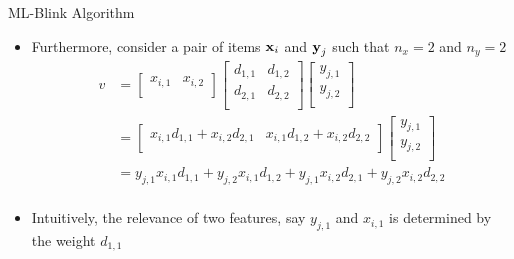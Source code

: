 \begin{frame}{ML-Blink Algorithm}
    \begin{itemize}
        \item Furthermore, consider a pair of items $\boldsymbol{\mathbf{x}}_i$ and $\boldsymbol{\mathbf{y}}_j$ such that $n_x = 2$ and $n_y = 2$
            \begin{equation} 
                \begin{split} 
                    v &= 
                        \begin{bmatrix}
                            x_{i,1} & x_{i,2} \\
                        \end{bmatrix}
                        \begin{bmatrix}
                            d_{1,1} & d_{1,2} \\
                            d_{2,1} & d_{2,2} \\
                        \end{bmatrix}
                        \begin{bmatrix}
                            y_{j,1} \\
                            y_{j,2} \\
                        \end{bmatrix} \\
                    &=
                        \begin{bmatrix}
                            x_{i,1}d_{1,1} + x_{i,2}d_{2,1} & x_{i,1}d_{1,2} + x_{i,2}d_{2,2} \\
                        \end{bmatrix}    
                        \begin{bmatrix}
                            y_{j,1} \\
                            y_{j,2} \\
                        \end{bmatrix} \\
                    &= 
                        y_{j,1}x_{i,1}d_{1,1} + y_{j,2}x_{i,1}d_{1,2} + y_{j,1}x_{i,2}d_{2,1} + y_{j,2}x_{i,2}d_{2,2} \\
                \end{split}
            \end{equation}
        \item Intuitively, the relevance of two features, say $y_{j,1}$ and $x_{i,1}$ is determined by the weight $d_{1,1}$
    \end{itemize}
\end{frame}


